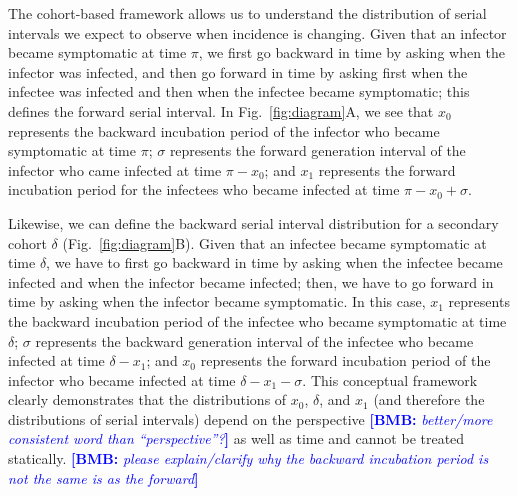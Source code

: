 \documentclass[12pt]{article}
\newcommand{\comment}{\showcomment}
\newcommand{\showcomment}[3]{\textcolor{#1}{\textbf{[#2: }\textsl{#3}\textbf{]}}}
\newcommand{\bmb}[1]{\comment{blue}{BMB}{#1}}
\newcommand{\fref}[1]{Fig.~\ref{fig:#1}}
\begin{document}
The cohort-based framework allows us to understand the distribution of serial intervals we expect to observe when incidence is changing.
Given that an infector became symptomatic at time $\pi$, we first go backward in time by asking when the infector was infected, and then go forward in time by asking first when the infectee was infected and then when the infectee became symptomatic;
this defines the forward serial interval.
In \fref{diagram}A, we see that $x_0$ represents the backward incubation period of the infector who became symptomatic at time $\pi$;
$\sigma$ represents the forward generation interval of the infector who came infected at time $\pi - x_0$;
and $x_1$ represents the forward incubation period for the infectees who became infected at time $\pi - x_0 + \sigma$.

Likewise, we can define the backward serial interval distribution for a secondary cohort $\delta$ (\fref{diagram}B).
Given that an infectee became symptomatic at time $\delta$, we have to first go backward in time by asking when the infectee became infected and when the infector became infected; 
then, we have to go forward in time by asking when the infector became symptomatic.
In this case, $x_1$ represents the backward incubation period of the infectee who became symptomatic at time $\delta$;
$\sigma$ represents the backward generation interval of the infectee who became infected at time $\delta-x_1$;
and $x_0$ represents the forward incubation period of the infector who became infected at time $\delta-x_1-\sigma$.
This conceptual framework clearly demonstrates that the distributions of $x_0$, $\delta$, and $x_1$ (and therefore the distributions of serial intervals) depend on the perspective \bmb{better/more consistent word than ``perspective''?} as well as time and cannot be treated statically.
\bmb{please explain/clarify why the backward incubation period is not the same is as the forward}
\end{document}
